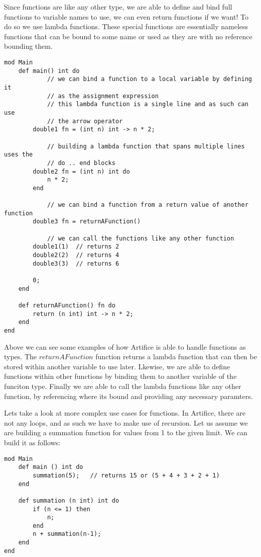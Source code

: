\documentclass{article}
\begin{document}
Since functions are like any other type, we are able to define and bind full functions to variable names to use, we can even return functions if we want!
To do so we use lambda functions. These special functions are essentially nameless functions that can be bound to some name or used as they are
with no reference bounding them.

\begin{lstlisting}
mod Main
	def main() int do
			// we can bind a function to a local variable by defining it 
			// as the assignment expression
			// this lambda function is a single line and as such can use
			// the arrow operator
		double1 fn = (int n) int -> n * 2;

			// building a lambda function that spans multiple lines uses the
			// do .. end blocks
		double2 fn = (int n) int do
			n * 2;
		end

			// we can bind a function from a return value of another function
		double3 fn = returnAFunction()

			// we can call the functions like any other function
		double1(1)  // returns 2
		double2(2)  // returns 4
		double3(3)  // returns 6

		0;
	end

	def returnAFunction() fn do
		return (n int) int -> n * 2;
	end
end
\end{lstlisting}

Above we can see some examples of how Artifice is able to handle functions as types. The $returnAFunction$ function returns a lambda function
that can then be stored within another variable to use later. Lkewise, we are able to define functions within other functions by binding them
to another variable of the funciton type. Finally we are able to call the lambda functions like any other function, by referencing where its
bound and providing any necessary paramters.

Lets take a look at more complex use cases for functions. In Artifice, there are not any loops, and as such we have to make use of recursion.
Let us assume we are building a summation function for values from 1 to the given limit. We can build it as follows:

\begin{lstlisting}
mod Main
	def main () int do
		summation(5); 	// returns 15 or (5 + 4 + 3 + 2 + 1)
	end

	def summation (n int) int do
		if (n <= 1) then
			n;
		end
		n + summation(n-1);
	end
end
\end{lstlisting}
\end{document}
